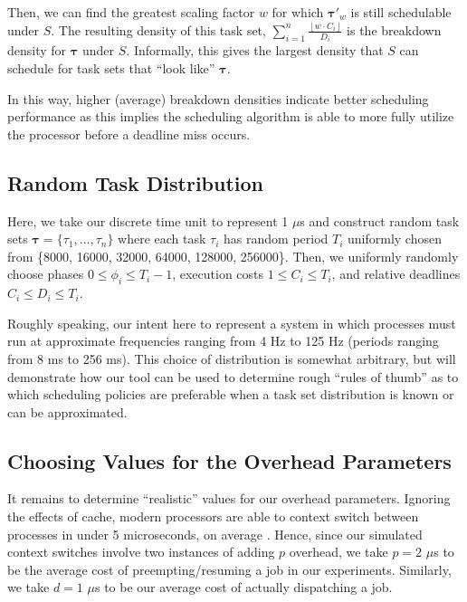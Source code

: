 \documentclass[11pt]{article}
\begin{document}
Then, we can find the greatest scaling factor $w$ for which $\bm{\tau}'_w$ is still schedulable under $S$. The resulting density of this task set, $\sum_{i=1}^n \frac{\left\lfloor w \cdot C_i \right\rfloor }{D_i}$ is the breakdown density for $\bm{\tau}$ under $S$. Informally, this gives the largest density that $S$ can schedule for task sets that ``look like'' $\bm{\tau}$.

In this way, higher (average) breakdown densities indicate better scheduling performance as this implies the scheduling algorithm is able to more fully utilize the processor before a deadline miss occurs.

\subsection{Random Task Distribution}\label{sec:TaskDistribution}

Here, we take our discrete time unit to represent 1 $\mu$s and construct random task sets $\bm{\tau} = \{\tau_1, \dots, \tau_n\}$ where each task $\tau_i$ has random period $T_i$ uniformly chosen from \{8000, 16000, 32000, 64000, 128000, 256000\}. Then, we uniformly randomly choose phases $0 \leq \phi_i \leq T_i - 1$, execution costs $1 \leq C_i \leq T_i$, and relative deadlines $C_i \leq D_i \leq T_i$.

Roughly speaking, our intent here to represent a system in which processes must run at approximate frequencies ranging from 4 Hz to 125 Hz (periods ranging from 8 ms to 256 ms). This choice of distribution is somewhat arbitrary, but will demonstrate how our tool can be used to determine rough ``rules of thumb'' as to which scheduling policies are preferable when a task set distribution is known or can be approximated.

\subsection{Choosing Values for the Overhead Parameters}\label{sec:OverheadParameters}

It remains to determine ``realistic'' values for our overhead parameters. Ignoring the effects of cache, modern processors are able to context switch between processes in under 5 microseconds, on average \cite{Li, McVoy}. Hence, since our simulated context switches involve two instances of adding $p$ overhead, we take $p=2$ $\mu$s to be the average cost of preempting/resuming a job in our experiments. Similarly, we take $d=1$ $\mu$s to be our average cost of actually dispatching a job.
\end{document}
